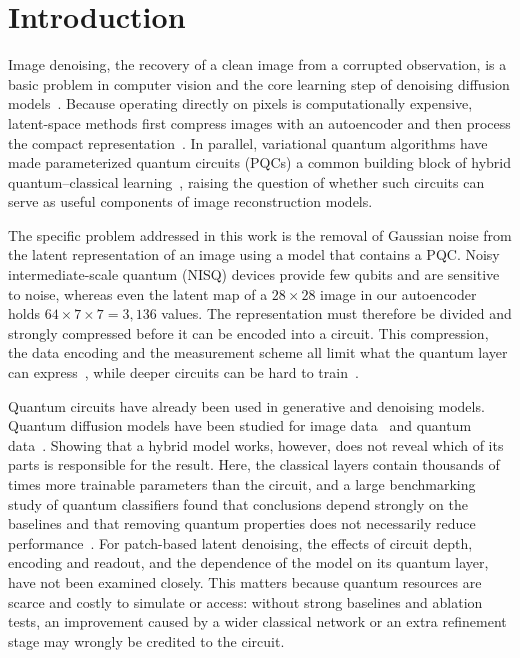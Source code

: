 \section{Introduction}\label{sec:intro}
Image denoising, the recovery of a clean image from a corrupted observation, is a basic problem in computer vision and the core learning step of denoising diffusion models~\cite{ho}. Because operating directly on pixels is computationally expensive, latent-space methods first compress images with an autoencoder and then process the compact representation~\cite{rombach}. In parallel, variational quantum algorithms have made parameterized quantum circuits (PQCs) a common building block of hybrid quantum--classical learning~\cite{cerezo,benedetti}, raising the question of whether such circuits can serve as useful components of image reconstruction models.

The specific problem addressed in this work is the removal of Gaussian noise from the latent representation of an image using a model that contains a PQC. Noisy intermediate-scale quantum (NISQ) devices provide few qubits and are sensitive to noise, whereas even the latent map of a $28\times28$ image in our autoencoder holds $64\times7\times7=3{,}136$ values. The representation must therefore be divided and strongly compressed before it can be encoded into a circuit. This compression, the data encoding and the measurement scheme all limit what the quantum layer can express~\cite{havlicek,schuld}, while deeper circuits can be hard to train~\cite{mcclean}.

Quantum circuits have already been used in generative and denoising models. Quantum diffusion models have been studied for image data~\cite{kolle,cacioppo} and quantum data~\cite{zhang}. Showing that a hybrid model works, however, does not reveal which of its parts is responsible for the result. Here, the classical layers contain thousands of times more trainable parameters than the circuit, and a large benchmarking study of quantum classifiers found that conclusions depend strongly on the baselines and that removing quantum properties does not necessarily reduce performance~\cite{bowles}. For patch-based latent denoising, the effects of circuit depth, encoding and readout, and the dependence of the model on its quantum layer, have not been examined closely. This matters because quantum resources are scarce and costly to simulate or access: without strong baselines and ablation tests, an improvement caused by a wider classical network or an extra refinement stage may wrongly be credited to the circuit.

